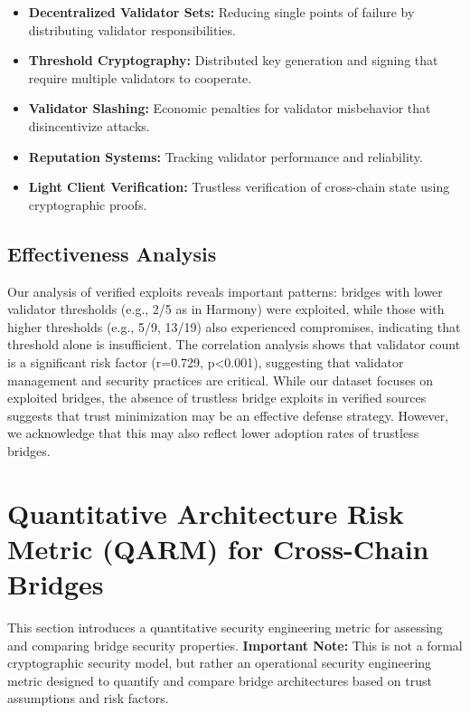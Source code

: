 \documentclass[runningheads]{llncs}
\begin{document}
\begin{itemize}
    \item \textbf{Decentralized Validator Sets:} Reducing single points of failure by distributing validator responsibilities.
    
    \item \textbf{Threshold Cryptography:} Distributed key generation and signing that require multiple validators to cooperate.
    
    \item \textbf{Validator Slashing:} Economic penalties for validator misbehavior that disincentivize attacks.
    
    \item \textbf{Reputation Systems:} Tracking validator performance and reliability.
    
    \item \textbf{Light Client Verification:} Trustless verification of cross-chain state using cryptographic proofs.
\end{itemize}

\subsection{Effectiveness Analysis}
Our analysis of verified exploits reveals important patterns: bridges with lower validator thresholds (e.g., 2/5 as in Harmony) were exploited, while those with higher thresholds (e.g., 5/9, 13/19) also experienced compromises, indicating that threshold alone is insufficient. The correlation analysis shows that validator count is a significant risk factor (r=0.729, p<0.001), suggesting that validator management and security practices are critical. While our dataset focuses on exploited bridges, the absence of trustless bridge exploits in verified sources suggests that trust minimization may be an effective defense strategy. However, we acknowledge that this may also reflect lower adoption rates of trustless bridges.

\vspace{-0.3cm}
\section{Quantitative Architecture Risk Metric (QARM) for Cross-Chain Bridges}
\label{sec:security_model}

This section introduces a quantitative security engineering metric for assessing and comparing bridge security properties. \textbf{Important Note:} This is not a formal cryptographic security model, but rather an operational security engineering metric designed to quantify and compare bridge architectures based on trust assumptions and risk factors.
\end{document}
